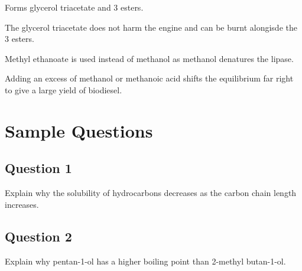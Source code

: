 \documentclass[a4paper,11pt]{article}
\begin{document}
Forms glycerol triacetate and 3 esters.

The glycerol triacetate does not harm the engine and can be burnt alongisde the
3 esters.

Methyl ethanoate is used instead of methanol as methanol denatures the lipase.

Adding an excess of methanol or methanoic acid shifts the equilibrium far right
to give a large yield of biodiesel.




\section{Sample Questions}

\subsection{Question 1}

Explain why the solubility of hydrocarbons decreases as the carbon chain length
increases.

\subsection{Question 2}

Explain why pentan-1-ol has a higher boiling point than 2-methyl butan-1-ol.
\end{document}
